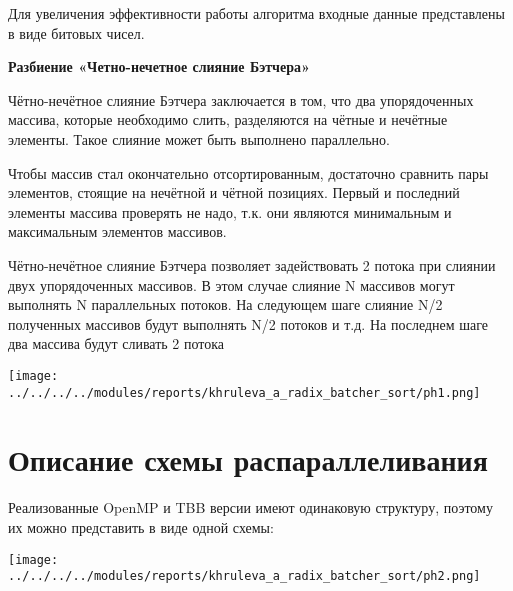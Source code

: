 \documentclass[a4paper,final]{report}
\begin{document}
\begin{spacing}{1.5}
		\par Для увеличения эффективности работы алгоритма входные данные представлены в виде битовых чисел. 
		\vspace{2ex}
		\par \textbf{Разбиение «Четно-нечетное слияние Бэтчера»}
		\par Чётно-нечётное слияние Бэтчера заключается в том, что два упорядоченных массива, которые необходимо слить, разделяются на чётные и нечётные элементы. Такое слияние может быть выполнено параллельно. 
		\par Чтобы массив стал окончательно отсортированным, достаточно сравнить пары элементов, стоящие на нечётной и чётной позициях. Первый и последний элементы массива проверять не надо, т.к. они являются минимальным и максимальным элементов массивов. 
		\par Чётно-нечётное слияние Бэтчера позволяет задействовать 2 потока при слиянии двух упорядоченных массивов. В этом случае слияние N массивов могут выполнять N параллельных потоков. На следующем шаге слияние N/2 полученных массивов будут выполнять N/2 потоков и т.д. На последнем шаге два массива будут сливать 2 потока 
 
        \vspace{2ex}
        
		\begin{center}
        \texttt{[image: ../../../../modules/reports/khruleva\_a\_radix\_batcher\_sort/ph1.png]}
        \end{center}
        
		\newpage
		\section{Описание схемы распараллеливания}
		
		\par Реализованные OpenMP и TBB версии имеют одинаковую структуру, поэтому их можно представить в виде одной схемы: 
		\vspace{2ex}
        
		\begin{center}
        \texttt{[image: ../../../../modules/reports/khruleva\_a\_radix\_batcher\_sort/ph2.png]}
        \end{center}
        

\end{spacing}
\end{document}
